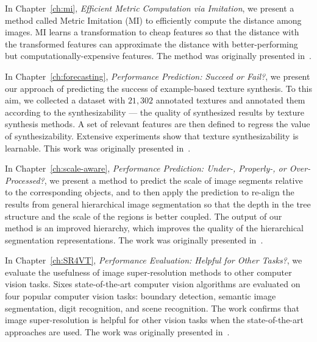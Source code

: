 In Chapter~\ref{ch:mi}, \emph{Efficient Metric Computation via Imitation}, we present a method called Metric Imitation (MI) to efficiently compute the distance among images.  MI learns a transformation to cheap features so that the distance with the transformed features can approximate the distance with better-performing but computationally-expensive features.  The method was originally presented in~\citep{metric:imitation}. 

In Chapter~\ref{ch:forecasting}, \emph{Performance Prediction: Succeed or Fail?}, we present our approach of predicting the success of example-based texture synthesis.  To this aim, we collected a dataset with  $21,302$ annotated textures and annotated them  according to the synthesizability --- the quality of synthesized results by texture synthesis methods. A set of relevant features are then defined to regress the value of synthesizability. Extensive experiments show that texture synthesizability is learnable. This work was originally presented in~\citep{dai:synthesizability}. 

In Chapter~\ref{ch:scale-aware}, \emph{Performance Prediction: Under-, Properly-, or Over-Processed?}, 
we present a method to predict the  scale of image segments relative to the corresponding objects, and to then apply the prediction to re-align the results from general hierarchical image segmentation so that the depth in the tree structure and the scale of the regions is better coupled. The output of our method is an improved hierarchy, which improves the quality of the hierarchical segmentation representations. The work was originally presented in~\citep{Chen2016}. 
  

In Chapter~\ref{ch:SR4VT}, \emph{Performance Evaluation: Helpful for Other Tasks?}, we evaluate the usefulness of image super-resolution methods to other computer vision tasks. Sixes state-of-the-art computer vision algorithms are evaluated on four popular computer vision tasks: boundary detection, semantic image segmentation, digit recognition, and scene recognition.  The work confirms that image super-resolution is helpful for other vision tasks when the state-of-the-art approaches are used. 
The work was originally presented in~\citep{SR4VTs:wacv16}. 


 